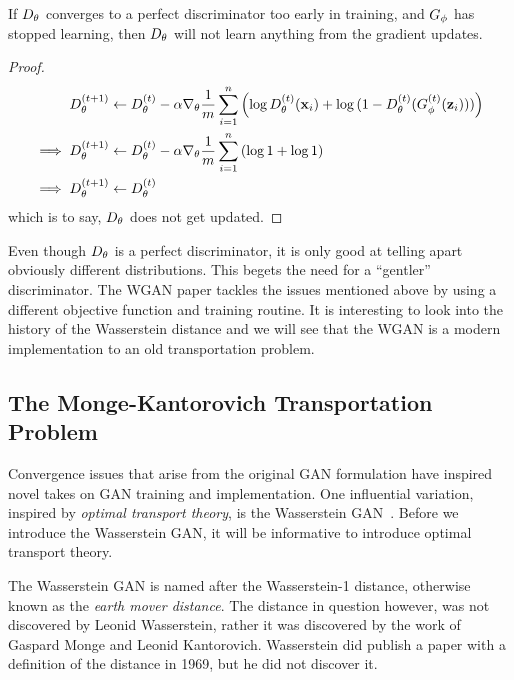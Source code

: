 \begin{theorem}%
  \label{thm:too-early}
  If $D_\theta$ converges to a perfect discriminator too early in training,
  and $G_\phi$ has stopped learning, then $D_\theta$ will not learn anything
  from the gradient updates.
\end{theorem}

\begin{proof}
  \begin{align}
    \label{eq:d-updates-no-good}
    D_\theta^{(t+1)} & \gets D_\theta^{(t)} - \alpha \nabla_\theta {1 \over m}
                 \sum_{i=1}^n \left( \log D^{(t)}_\theta(\mathbf{x}_i)
                 + \log{(1 - D^{(t)}_\theta(G^{(t)}_\phi(\mathbf{z}_i)))} \right) \\
    \implies D_\theta^{(t+1)} & \gets D_\theta^{(t)} - \alpha\nabla_\theta {1 \over m} \sum_{i=1}^n \left( \log{1} + \log{1} \right) \\
    \implies D_\theta^{(t+1)} & \gets D_\theta^{(t)}
  \end{align} which is to say, $D_\theta$ does not get updated.
\end{proof}

Even though $D_\theta$ is a perfect discriminator, it is only good at
telling apart obviously different distributions. This begets the need
for a ``gentler'' discriminator.  The WGAN paper tackles the issues
mentioned above by using a different objective function and training
routine.  It is interesting to look into the history of the
Wasserstein distance and we will see that the WGAN is a modern
implementation to an old transportation problem.

\subsection{The Monge-Kantorovich Transportation Problem}

Convergence issues that arise from the original GAN formulation have
inspired novel takes on GAN training and implementation. One
influential variation, inspired by \textit{optimal transport theory},
is the Wasserstein GAN~\cite{ref:arjovsky-2017}. Before we introduce
the Wasserstein GAN, it will be informative to introduce optimal
transport theory.

The Wasserstein GAN is named after the Wasserstein-1 distance,
otherwise known as the \textit{earth mover distance}. The distance in
question however, was not discovered by Leonid Wasserstein, rather it
was discovered by the work of Gaspard Monge and Leonid
Kantorovich. Wasserstein did publish a paper with a definition of the
distance in 1969, but he did not discover it.

